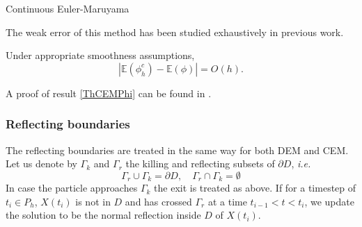 \begin{algorithm}[t]
\caption{Continuous Euler-Maruyama}
\label{alg:algoCEM}
\end{algorithm}

\noindent The weak error of this method has been studied exhaustively in previous work.
\begin{theorem}\label{ThCEMPhi} Under appropriate smoothness assumptions, 
\begin{equation}\label{eq:ConvCEMPhi}
	|\mathbb{E}(\phi_h^c) - \mathbb{E}(\phi)| = O(h).
\end{equation}
\end{theorem}
A proof of result \ref{ThCEMPhi} can be found in \cite{Gobet2001}.

\subsubsection{Reflecting boundaries}
The reflecting boundaries are treated in the same way for both DEM and CEM. Let us denote by $\Gamma_k$ and $\Gamma_r$ the killing and reflecting subsets of $\partial D$, \textit{i.e.}
\begin{equation}\label{eq:Boundaries}
	\Gamma_r \cup \Gamma_k = \partial D, \quad \Gamma_r \cap \Gamma_k = \emptyset
\end{equation} 
In case the particle approaches $\Gamma_k$ the exit is treated as above. If for a timestep of $t_i \in P_h$, $X(t_i)$ is not in $D$ and has crossed $\Gamma_r$ at a time $t_{i-1} < t < t_i$, we update the solution to be the normal reflection inside $D$ of $X(t_i)$.




